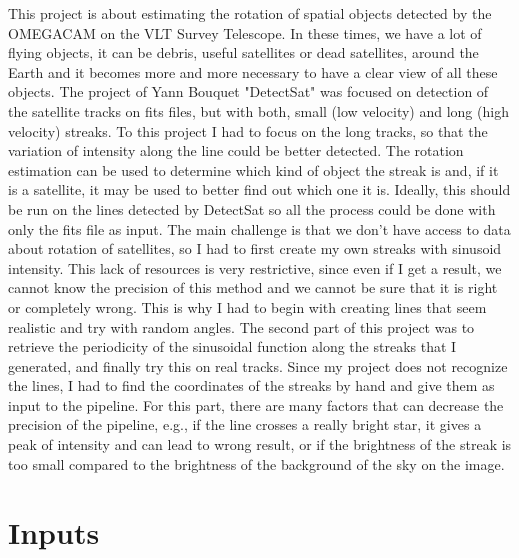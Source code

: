 \documentclass[a4paper,12pt,oneside]{report}
\begin{document}
This project is about estimating the rotation of spatial objects detected by the OMEGACAM on the VLT Survey Telescope. In these times,
we have a lot of flying objects, it can be debris, useful satellites or dead satellites, around the Earth and it becomes more and more
necessary to have a clear view of all these objects.
The project of Yann Bouquet "DetectSat"\cite{detectsatRepository} was focused on detection of the satellite tracks on fits files, but with both,
small (low velocity) and long (high velocity) streaks. To this project I had to focus on the long tracks, so that the variation of intensity
along the line could be better detected. The rotation estimation can be used to determine which kind of object the streak is and, if it is
a satellite, it may be used to better find out which one it is. Ideally, this should be run on the lines detected by DetectSat so all the process
could be done with only the fits file as input.
\newline
\newline
The main challenge is that we don't have access to data about rotation of satellites, so I had to first create my own streaks 
with sinusoid intensity. This lack of resources is very restrictive, since even if I get a result, we cannot know the precision of this method 
and we cannot be sure that it is right or completely wrong. This is why I had to begin with creating lines that seem realistic and
try with random angles.
\newline
\newline
The second part of this project was to retrieve the periodicity of the sinusoidal function along the streaks that I generated, and finally
try this on real tracks. Since my project does not recognize the lines, I had to find the coordinates of the streaks by hand and give them
as input to the pipeline. For this part, there are many factors that can decrease the precision of the pipeline, e.g., if the line crosses a
really bright star, it gives a peak of intensity and can lead to wrong result, or if the brightness of the streak is too small
compared to the brightness of the background of the sky on the image. 


\chapter{Inputs}
\end{document}
